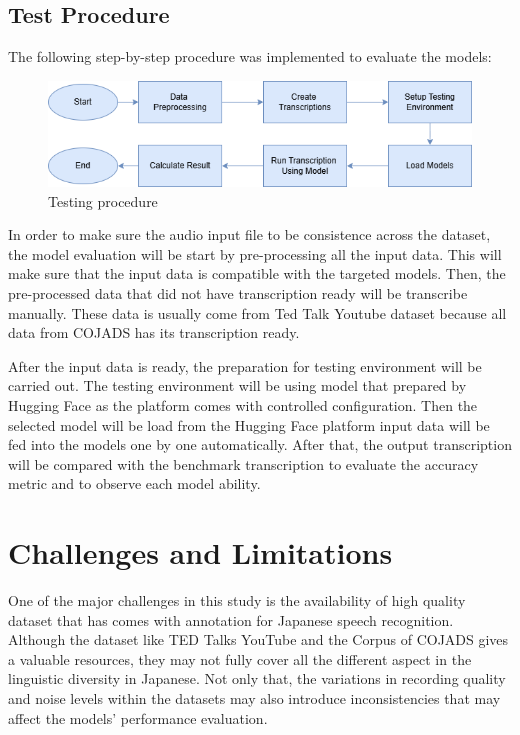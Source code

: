 \subsection{Test Procedure}
The following step-by-step procedure was implemented to evaluate the models:

\begin{figure}[!ht]
    \centering
    \includegraphics[width=1\textwidth]{mainmatter//images/step.png}
    \caption{Testing procedure }
\end{figure}

In order to make sure the audio input file to be consistence across the dataset, the model evaluation will be start by pre-processing all the input data. This will make sure that the input data is compatible with the targeted models. Then, the pre-processed data that did not have transcription ready will be transcribe manually. These data is usually come from Ted Talk Youtube dataset because all data from COJADS has its transcription ready.

After the input data is ready, the preparation for testing environment will be carried out. The testing environment will be using model that prepared by Hugging Face as the platform comes with controlled configuration. Then the selected model will be load from the Hugging Face platform input data will be fed into the models one by one automatically. After that, the output transcription will be compared with the benchmark transcription to evaluate the accuracy metric and to observe each model ability. 

\section{Challenges and Limitations}
One of the major challenges in this study is the availability of high quality dataset that has comes with annotation for Japanese speech recognition. Although the dataset like TED Talks YouTube and the Corpus of COJADS gives a valuable resources, they may not fully cover all the different aspect in the linguistic diversity in Japanese. Not only that, the variations in recording quality and noise levels within the datasets may also introduce inconsistencies that may affect the models’ performance evaluation.

